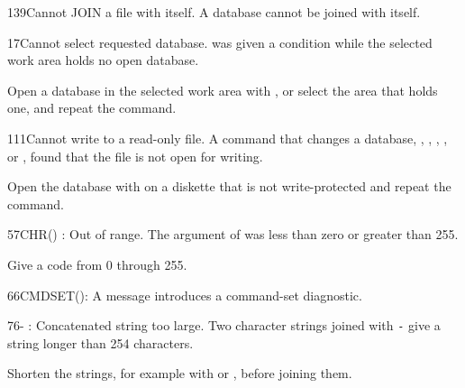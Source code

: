 \begin{XbaseMessageEntry}{139}{Cannot JOIN a file with itself.}
A database cannot be joined with itself.
\end{XbaseMessageEntry}

\begin{XbaseMessageEntry}{17}{Cannot select requested database.}
 was given a condition while the selected work area holds no open database.

Open a database in the selected work area with , or select the area that holds one, and repeat the command.
\end{XbaseMessageEntry}

\begin{XbaseMessageEntry}{111}{Cannot write to a read-only file.}
A command that changes a database, , , , ,  or , found that the file is not open for writing.

Open the database with  on a diskette that is not write-protected and repeat the command.
\end{XbaseMessageEntry}

\begin{XbaseMessageEntry}{57}{CHR() : Out of range.}
The argument of  was less than zero or greater than 255.

Give  a code from 0 through 255.
\end{XbaseMessageEntry}

\begin{XbaseMessageEntry}{66}{CMDSET():}
A message introduces a command-set diagnostic.
\end{XbaseMessageEntry}

\begin{XbaseMessageEntry}{76}{- : Concatenated string too large.}
Two character strings joined with \texttt{-} give a string longer than 254 characters.

Shorten the strings, for example with  or , before joining them.
\end{XbaseMessageEntry}

